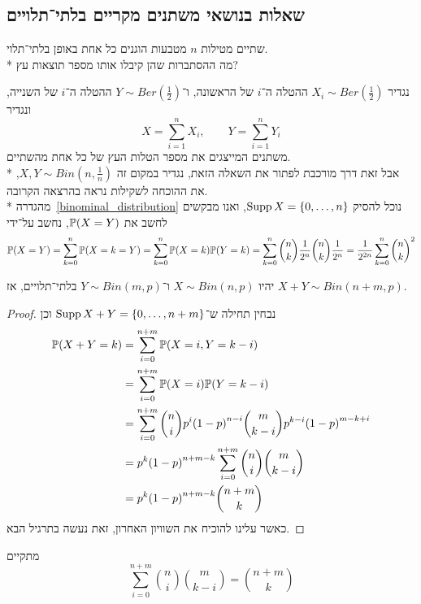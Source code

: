\subsection{שאלות בנושאי משתנים מקריים בלתי־תלויים}
\begin{exercise}
	שתיים מטילות $n$ מטבעות הוגנים כל אחת באופן בלתי־תלוי. \\*
	מה ההסתברות שהן קיבלו אותו מספר תוצאות עץ?
\end{exercise}
\begin{solution}
	נגדיר $X_i \sim Ber(\frac{1}{2})$ ההטלה ה־$i$ של הראשונה, ו־$Y \sim Ber(\frac{1}{2})$ ההטלה ה־$i$ של השנייה, ונגדיר
	\[
		X = \sum_{i = 1}^{n} X_i,
		\qquad
		Y = \sum_{i = 1}^{n} Y_i
	\]
	משתנים המייצגים את מספר הטלות העץ של כל אחת מהשתיים. \\*
	אבל זאת דרך מורכבת לפתור את השאלה הזאת, נגדיר במקום זה $X, Y \sim Bin(n, \frac{1}{n})$, את ההוכחה לשקילות נראה בהרצאה הקרובה. \\*
	מהגדרה\ \ref{binominal_distribution} נוכל להסיק $\operatorname{Supp} X = \{0, \dots, n\}$, ואנו מבקשים לחשב את $\mathbb{P}(X = Y)$, נחשב על־ידי
	\[
		\mathbb{P}(X = Y)
		= \sum_{k = 0}^{n} \mathbb{P}(X = k = Y)
		= \sum_{k = 0}^{n} \mathbb{P}(X = k) \mathbb{P}(Y = k)
		= \sum_{k = 0}^{n} \binom{n}{k} \frac{1}{2^n} \binom{n}{k} \frac{1}{2^n}
		= \frac{1}{2^{2n}} \sum_{k = 0}^{n} {\binom{n}{k}}^2
	\]
\end{solution}
\begin{proposition}\label{binominal_distributions_summation_proposition}
	יהיו $X \sim Bin(n, p)$ ו־$Y \sim Bin(m, p)$ בלתי־תלויים, אז $X + Y \sim Bin(n + m, p)$.
\end{proposition}
\begin{proof}
	נבחין תחילה ש־$\operatorname{Supp} X + Y = \{0, \dots, n + m\}$ וכן
	\begin{align*}
		\mathbb{P}(X + Y = k)
		& = \sum_{i = 0}^{n + m} \mathbb{P}(X = i, Y = k - i) \\
		& = \sum_{i = 0}^{n + m} \mathbb{P}(X = i) \mathbb{P}(Y = k - i) \\
		& = \sum_{i = 0}^{n + m} \binom{n}{i} p^i {(1 - p)}^{n - i} \binom{m}{k - i} p^{k - i} {(1 - p)}^{m - k + i} \\
		& = p^k {(1 - p)}^{n + m - k} \sum_{i = 0}^{n + m} \binom{n}{i} \binom{m}{k - i} \\
		& = p^k {(1 - p)}^{n + m - k} \binom{n + m}{k}
	\end{align*}
	כאשר עלינו להוכיח את השוויון האחרון, זאת נעשה בתרגיל הבא.
\end{proof}
\begin{exercise}
	מתקיים
	\[
		\sum_{i = 0}^{n + m} \binom{n}{i} \binom{m}{k - i}
		= \binom{n + m}{k}
	\]
\end{exercise}
